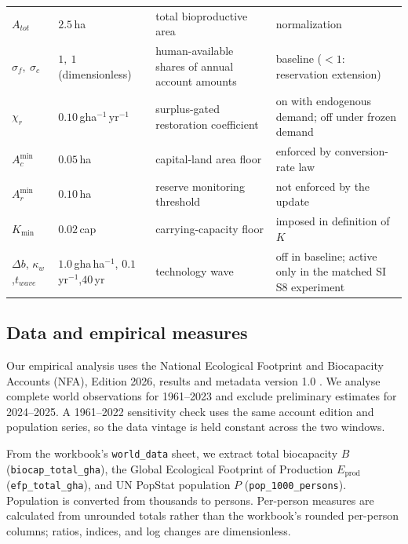 \documentclass[preprint,12pt,authoryear]{elsarticle}
\newcommand{\Acmin}{A_c^{\min}}
\begin{document}
\begin{table}[!htbp]
\begin{tabularx}{\textwidth}{@{}>{\raggedright\arraybackslash}p{} >{\raggedright\arraybackslash}p{} >{\raggedright\arraybackslash}X >{\raggedright\arraybackslash}p{}@{}}
$A_{tot}$ & $2.5$\,ha & total bioproductive area & normalization \\
$\sigma_f,\ \sigma_c$ & $1,\ 1$ (dimensionless) & human-available shares of annual account amounts & baseline ($<1$: reservation extension) \\
$\chi_r$ & $0.10$\,gha$^{-1}$\,yr$^{-1}$ & surplus-gated restoration coefficient & on with endogenous demand; off under frozen demand \\
$\Acmin$ & $0.05$\,ha & capital-land area floor & enforced by conversion-rate law \\
$A_r^{\min}$ & $0.10$\,ha & reserve monitoring threshold & not enforced by the update \\
$K_{\min}$ & $0.02$\,cap & carrying-capacity floor & imposed in definition of $K$ \\
$\Delta b$, $\kappa_w$,\newline $t_{wave}$ & $1.0$\,gha\,ha$^{-1}$, $0.1$\,yr$^{-1}$,\newline $40$\,yr & technology wave & off in baseline; active only in the matched SI S8 experiment \\
\bottomrule
\end{tabularx}
\end{table}

\subsection{Data and empirical measures}\label{sec:data}

Our empirical analysis uses the National Ecological Footprint and Biocapacity Accounts (NFA), Edition 2026, results and metadata version 1.0 \citep{Lo2026NFA}. We analyse complete world observations for 1961--2023 and exclude preliminary estimates for 2024--2025. A 1961--2022 sensitivity check uses the same account edition and population series, so the data vintage is held constant across the two windows.

From the workbook's \texttt{world\_data} sheet, we extract total biocapacity $B$ (\texttt{biocap\_total\_gha}), the Global Ecological Footprint of Production $E_{\mathrm{prod}}$ (\texttt{efp\_total\_gha}), and UN PopStat population $P$ (\texttt{pop\_1000\_persons}). Population is converted from thousands to persons. Per-person measures are calculated from unrounded totals rather than the workbook's rounded per-person columns; ratios, indices, and log changes are dimensionless.
\end{document}
